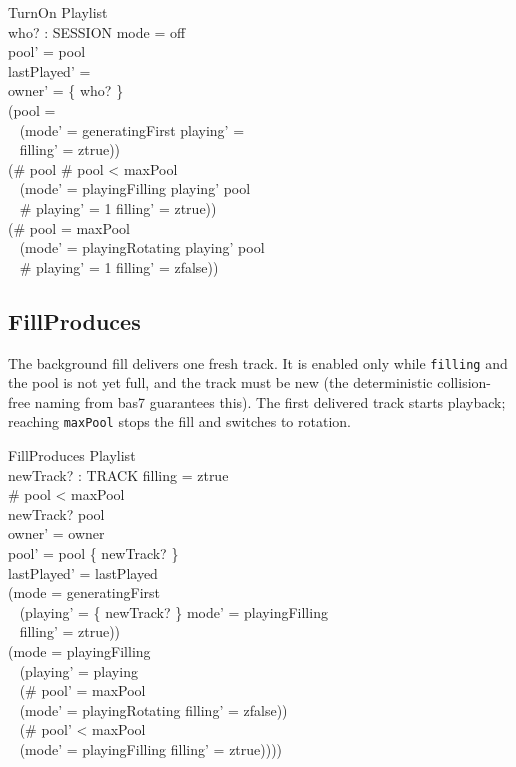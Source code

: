 \documentclass[a4paper,10pt,fleqn]{article}
\begin{document}
\begin{schema}{TurnOn}
  \Delta Playlist \\
  who? : SESSION
  \where
  mode = off \\
  pool' = pool \\
  lastPlayed' = \emptyset \\
  owner' = \{ who? \} \\
  (pool = \emptyset \implies \\
    \quad~ (mode' = generatingFirst \land playing' = \emptyset \\
  \quad~ \land filling' = ztrue)) \\
  (\# pool  \land \# pool < maxPool \implies \\
    \quad~ (mode' = playingFilling \land playing' \subseteq pool \\
  \quad~ \land \# playing' = 1 \land filling' = ztrue)) \\
  (\# pool = maxPool \implies \\
    \quad~ (mode' = playingRotating \land playing' \subseteq pool \\
  \quad~ \land \# playing' = 1 \land filling' = zfalse))
\end{schema}

\subsection{FillProduces}

The background fill delivers one fresh track. It is enabled only while
\texttt{filling} and the pool is not yet full, and the track must be new
(the deterministic collision-free naming from bas7 guarantees this). The
first delivered track starts playback; reaching \texttt{maxPool} stops
the fill and switches to rotation.

\begin{schema}{FillProduces}
  \Delta Playlist \\
  newTrack? : TRACK
  \where
  filling = ztrue \\
  \# pool < maxPool \\
  newTrack? \notin pool \\
  owner' = owner \\
  pool' = pool \cup \{ newTrack? \} \\
  lastPlayed' = lastPlayed \\
  (mode = generatingFirst \implies \\
    \quad~ (playing' = \{ newTrack? \} \land mode' = playingFilling \\
  \quad~ \land filling' = ztrue)) \\
  (mode = playingFilling \implies \\
    \quad~ (playing' = playing \\
      \quad~ \land (\# pool' = maxPool \implies \\
      \quad\quad~ (mode' = playingRotating \land filling' = zfalse)) \\
      \quad~ \land (\# pool' < maxPool \implies \\
  \quad\quad~ (mode' = playingFilling \land filling' = ztrue))))
\end{schema}
\end{document}
